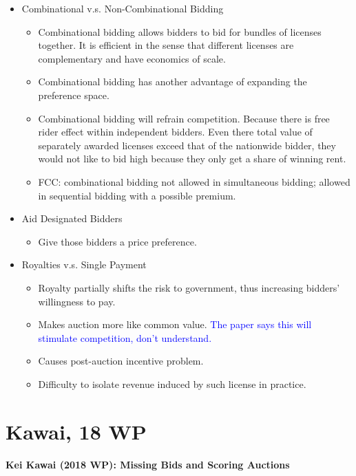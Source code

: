\documentclass{book}
\theoremstyle{plain}
\theoremstyle{definition}
\begin{document}
\begin{itemize}
	\item Combinational v.s. Non-Combinational Bidding
	\begin{itemize}
		\item Combinational bidding allows bidders to bid for bundles of licenses together. It is efficient in the sense that different licenses are complementary and have economics of scale.
		\item Combinational bidding has another advantage of expanding the preference space.
		\item Combinational bidding will refrain competition. Because there is free rider effect within independent bidders. Even there total value of separately awarded licenses exceed that of the nationwide bidder, they would not like to bid high because they only get a share of winning rent.
		\item FCC: combinational bidding not allowed in simultaneous bidding; allowed in sequential bidding with a possible premium.
	\end{itemize}

	\item Aid Designated Bidders
	\begin{itemize}
		\item Give those bidders a price preference.
	\end{itemize}

	\item Royalties v.s. Single Payment
	\begin{itemize}
		\item Royalty partially shifts the risk to government, thus increasing bidders' willingness to pay.
		\item Makes auction more like common value. \textcolor{blue}{The paper says this will stimulate competition, don't understand.}
		\item Causes post-auction incentive problem.
		\item Difficulty to isolate revenue induced by such license in practice.
	\end{itemize}
\end{itemize}



\section{Kawai, 18 WP} %
\label{sec:kawai_18_wp}

\noindent
\textbf{Kei Kawai (2018 WP): Missing Bids and Scoring Auctions}\\
\end{document}
